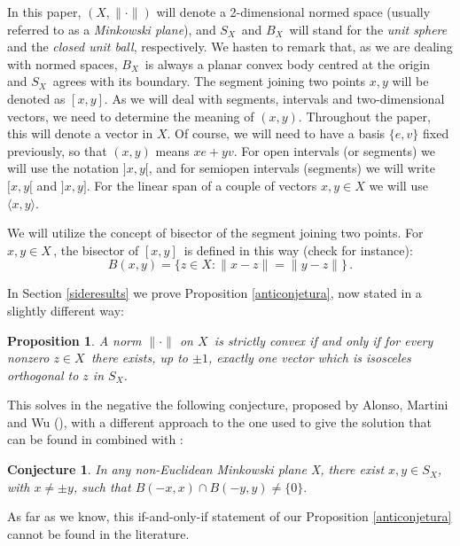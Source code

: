 \documentclass[12pt]{amsproc}
\newtheorem*{proposition-non}{Proposition}
\newtheorem*{conjecture-non}{Conjecture}
\theoremstyle{remark}
\def\norma{\|\cdot\|}
\begin{document}
In this paper, $(X,\norma)$ will denote a 2-dimensional normed space (usually referred to as 
a {\it Minkowski plane}), and $S_X\,$ and $B_X\,$ will stand for the {\it unit sphere} and the {\it closed 
unit ball}, respectively. We hasten to remark that, as we are dealing with normed spaces, $B_X\,$ is always a planar convex body centred at the origin and $S_X\,$ agrees with its boundary. The segment 
joining two points $x, y$ will be denoted as $[x, y]$. As we will deal with segments, 
intervals and two-dimensional vectors, we need to determine the meaning of $(x,y)$. 
Throughout the paper, this will denote a vector in $X$. Of course, we will need to have a basis $\{e,v\}$ fixed previously, so that $(x,y)$ means $xe+yv$. For open intervals 
(or segments) we will use the notation $]x,y[$, and for semiopen intervals 
(segments) we will write $[x,y[$ and $]x,y]$. For the linear span of a couple of vectors $x,y\in X$ 
we will use $\langle x,y\rangle$. 

We will utilize the concept of bisector of the segment joining two points. For $x,y\in X\,$, 
the bisector of $[x,y]\,$ is defined in this way 
(check \cite{alonso2012birkhoff, barschnei2014, BisectorsHMW, BisectorsJS, ma2000bisectors} for instance):
$$
B(x,y)=\{z\in X:\|x-z\|=\|y-z\|\}\,.
$$

\medskip

In Section \ref{sideresults} we prove Proposition \ref{anticonjetura}, now stated in a slightly different way:

\begin{proposition-non} A norm $\norma$ on $X\,$ is strictly 
convex if and only if for every nonzero $z\in X\,$ there exists, up to $\pm 1$, exactly one vector which is isosceles orthogonal to $z$ in $S_X$.
\end{proposition-non}

This solves in the negative the following conjecture, proposed by Alonso, Martini and Wu (\cite[Conj. 5.3.]{alonso2012birkhoff}),  
with a different approach to the one used to give the solution that can be found in \cite[Prop. 5]{alonso1994} combined with \cite[Cor. 2.5]{jiliwu2011}:

\begin{conjecture-non}
In any non-Euclidean Minkowski plane X, there exist $x, y\in S_X$, 
with $x\neq  \pm y$, such that $B(-x,x)\cap B(-y,y)\neq\{0\}.$ 
\end{conjecture-non}

As far as we know, this if-and-only-if statement of our Proposition \ref{anticonjetura} cannot be found in the literature.
\end{document}
